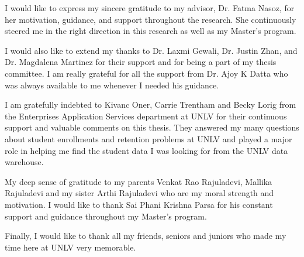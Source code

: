 \documentclass[11pt,openright]{report}
\begin{document}


\begin{thesisacknowledgments}
I would like to express my sincere gratitude to my advisor, Dr. Fatma Nasoz, for her motivation, guidance, and support throughout the research. She continuously steered me in the right direction in this research as well as my Master's program.

I would also like to extend my thanks to Dr. Laxmi Gewali, Dr. Justin Zhan, and Dr. Magdalena Martinez for their support and for being a part of my thesis committee. I am really grateful for all the support from Dr. Ajoy K Datta who was always available to me whenever I needed his guidance.

I am gratefully indebted to Kivanc Oner, Carrie Trentham and Becky Lorig from the Enterprises Application Services department at UNLV for their continuous support and valuable comments on this thesis. They answered my many questions about student enrollments and retention problems at UNLV and played a major role in helping me find the student data I was looking for from the UNLV data warehouse.

My deep sense of gratitude to my parents Venkat Rao Rajuladevi, Mallika Rajuladevi and my sister Arthi Rajuladevi who are my moral strength and motivation. I would like to thank Sai Phani Krishna Parsa for his constant support and guidance throughout my Master's program.

Finally, I would like to thank all my friends, seniors and juniors who made my time here at UNLV very memorable. 
\end{thesisacknowledgments}

\pagestyle{plain}

\tableofcontents
\clearpage
\listoftables
\clearpage
\listoffigures
\clearpage
\listofalgorithmes
\clearpage

\end{document}
